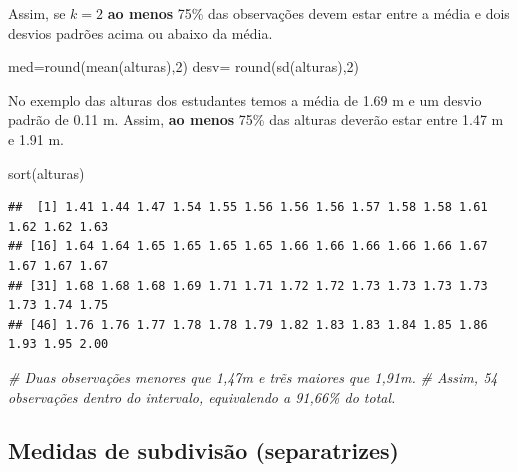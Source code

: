 \documentclass[
]{book}
\newenvironment{Shaded}{\begin{snugshade}}{\end{snugshade}}
\newcommand{\CommentTok}[1]{\textcolor[rgb]{0.56,0.35,0.01}{\textit{#1}}}
\newcommand{\DecValTok}[1]{\textcolor[rgb]{0.00,0.00,0.81}{#1}}
\newcommand{\FunctionTok}[1]{\textcolor[rgb]{0.00,0.00,0.00}{#1}}
\newcommand{\NormalTok}[1]{#1}
\newcommand{\OtherTok}[1]{\textcolor[rgb]{0.56,0.35,0.01}{#1}}
\begin{document}
\hfill\break

Assim, se \(k=2\) \textbf{ao menos} 75\% das observações devem estar entre a média e dois desvios padrões acima ou abaixo da média.

\hfill\break

\begin{Shaded}
\begin{Highlighting}[]
\NormalTok{med}\OtherTok{=}\FunctionTok{round}\NormalTok{(}\FunctionTok{mean}\NormalTok{(alturas),}\DecValTok{2}\NormalTok{)}
\NormalTok{desv}\OtherTok{=} \FunctionTok{round}\NormalTok{(}\FunctionTok{sd}\NormalTok{(alturas),}\DecValTok{2}\NormalTok{)}
\end{Highlighting}
\end{Shaded}

\hfill\break

No exemplo das alturas dos estudantes temos a média de 1.69 m e um desvio padrão de 0.11 m. Assim, \textbf{ao menos} 75\% das alturas deverão estar entre 1.47 m e 1.91 m.

\hfill\break

\begin{Shaded}
\begin{Highlighting}[]
\FunctionTok{sort}\NormalTok{(alturas)}
\end{Highlighting}
\end{Shaded}

\begin{verbatim}
##  [1] 1.41 1.44 1.47 1.54 1.55 1.56 1.56 1.56 1.57 1.58 1.58 1.61 1.62 1.62 1.63
## [16] 1.64 1.64 1.65 1.65 1.65 1.65 1.66 1.66 1.66 1.66 1.66 1.67 1.67 1.67 1.67
## [31] 1.68 1.68 1.68 1.69 1.71 1.71 1.72 1.72 1.73 1.73 1.73 1.73 1.73 1.74 1.75
## [46] 1.76 1.76 1.77 1.78 1.78 1.79 1.82 1.83 1.83 1.84 1.85 1.86 1.93 1.95 2.00
\end{verbatim}

\begin{Shaded}
\begin{Highlighting}[]
\CommentTok{\# Duas observações menores que 1,47m e trẽs maiores que 1,91m.}
\CommentTok{\# Assim, 54 observações dentro do intervalo, equivalendo a 91,66\% do total.}
\end{Highlighting}
\end{Shaded}

\hypertarget{medidas-de-subdivisuxe3o-separatrizes}{%
\subsection{Medidas de subdivisão (separatrizes)}\label{medidas-de-subdivisuxe3o-separatrizes}}
\end{document}
